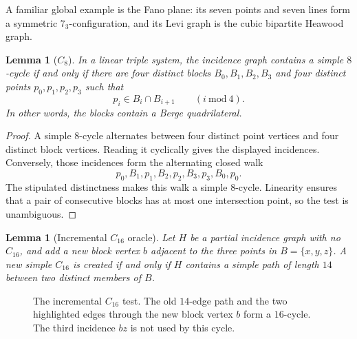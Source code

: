 \documentclass[11pt]{article}
\newtheorem{lemma}[theorem]{Lemma}
\theoremstyle{definition}
\begin{document}
A familiar global example is the Fano plane: its seven points and seven lines
form a symmetric \(7_3\)-configuration, and its Levi graph is the cubic
bipartite Heawood graph.

\begin{lemma}[\(C_8\)]\label{lem:c8}
In a linear triple system, the incidence graph contains a simple \(8\)-cycle
if and only if there are four distinct blocks
\(B_0,B_1,B_2,B_3\) and four distinct points
\(p_0,p_1,p_2,p_3\) such that
\[
  p_i\in B_i\cap B_{i+1}\qquad (i\ \mathrm{mod}\ 4).
\]
In other words, the blocks contain a Berge quadrilateral.
\end{lemma}

\begin{proof}
A simple \(8\)-cycle alternates between four distinct point vertices and four
distinct block vertices.  Reading it cyclically gives the displayed
incidences.  Conversely, those incidences form the alternating closed walk
\[
 p_0,B_1,p_1,B_2,p_2,B_3,p_3,B_0,p_0.
\]
The stipulated distinctness makes this walk a simple \(8\)-cycle.  Linearity
ensures that a pair of consecutive blocks has at most one intersection
point, so the test is unambiguous.
\end{proof}

\begin{lemma}[Incremental \(C_{16}\) oracle]\label{lem:c16}
Let \(H\) be a partial incidence graph with no \(C_{16}\), and add a new block
vertex \(b\) adjacent to the three points in \(B=\{x,y,z\}\).  A new simple
\(C_{16}\) is created if and only if \(H\) contains a simple path of length
\(14\) between two distinct members of \(B\).
\end{lemma}

\begin{figure}[htbp]
\centering
{}
\caption{The incremental \(C_{16}\) test. The old \(14\)-edge path and the
two highlighted edges through the new block vertex \(b\) form a
\(16\)-cycle. The third incidence \(bz\) is not used by this cycle.}
\label{fig:c16-oracle}
\end{figure}
\end{document}
